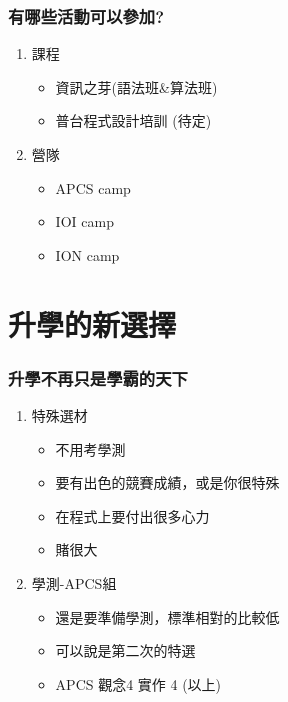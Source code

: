 \documentclass[mathserif]{beamer}
\begin{document}
    \begin{frame}
        \frametitle{有哪些活動可以參加?}
        \begin{enumerate}
            \item 課程
            \begin{itemize}
                \item 資訊之芽(語法班\&算法班)
                \item 普台程式設計培訓 (待定)
            \end{itemize}
            \item 營隊
            \begin{itemize}
                \item APCS camp
                \item IOI camp
                \item ION camp
            \end{itemize}
        \end{enumerate}
    \end{frame}

        \section{升學的新選擇}

    \begin{frame}
        \frametitle{升學不再只是學霸的天下}
        \begin{enumerate}
            \item 特殊選材
            \begin {itemize}
                \item 不用考學測
                \pause
                \item 要有出色的競賽成績，或是你很特殊
                \pause
                \item 在程式上要付出很多心力
                \pause
                \item 賭很大
            \end {itemize}
            \pause
            \item 學測-APCS組
            \begin{itemize}
                \item 還是要準備學測，標準相對的比較低
                \pause
                \item 可以說是第二次的特選
                \pause
                \item APCS 觀念4 實作 4 (以上)
            \end{itemize}
        \end{enumerate}
    \end{frame}
\end{document}
